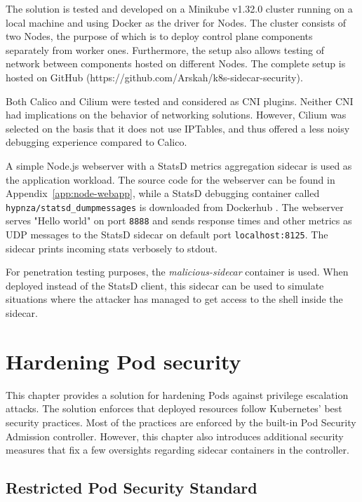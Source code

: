 \documentclass[english, 12pt, a4paper, sci, utf8, a-2b, online]{aaltothesis}
\begin{document}
The solution is tested and developed on a Minikube v1.32.0 cluster running on a local machine and using Docker as the driver for Nodes.
The cluster consists of two Nodes, the purpose of which is to deploy control plane components separately from worker ones.
Furthermore, the setup also allows testing of network between components hosted on different Nodes.
The complete setup is hosted on GitHub (https://github.com/Arskah/k8s-sidecar-security).

Both Calico and Cilium were tested and considered as CNI plugins.
Neither CNI had implications on the behavior of networking solutions.
However, Cilium was selected on the basis that it does not use IPTables, and thus offered a less noisy debugging experience compared to Calico.

A simple Node.js webserver with a StatsD metrics aggregation sidecar is used as the application workload.
The source code for the webserver can be found in Appendix~\ref{app:node-webapp}, while a StatsD debugging container called \lstinline{hypnza/statsd_dumpmessages} is downloaded from Dockerhub \cite{statsd-container}.
The webserver serves "Hello world" on port \lstinline{8888} and sends response times and other metrics as UDP messages to the StatsD sidecar on default port \lstinline{localhost:8125}.
The sidecar prints incoming stats verbosely to stdout.

For penetration testing purposes, the \emph{malicious-sidecar} container is used.
When deployed instead of the StatsD client, this sidecar can be used to simulate situations where the attacker has managed to get access to the shell inside the sidecar.

\clearpage

\section{Hardening Pod security} \label{sec:pod-hardening}

This chapter provides a solution for hardening Pods against privilege escalation attacks.
The solution enforces that deployed resources follow Kubernetes' best security practices.
Most of the practices are enforced by the built-in Pod Security Admission controller.
However, this chapter also introduces additional security measures that fix a few oversights regarding sidecar containers in the controller.

\subsection{Restricted Pod Security Standard}
\end{document}
